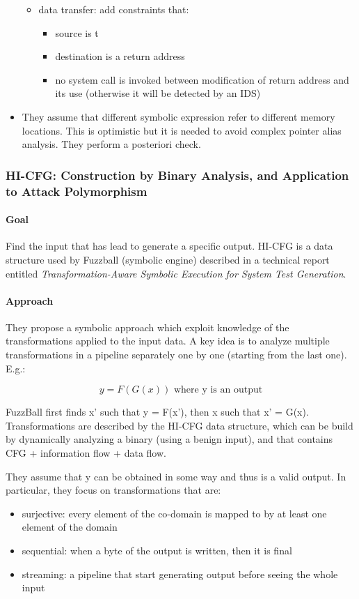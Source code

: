 \begin{itemize}
\begin{itemize}
    \item data transfer: add constraints that:
      \begin{itemize}
        \item source is t
        \item destination is a return address 
        \item no system call is invoked between modification of return address and its use (otherwise it will be detected by an IDS)
      \end{itemize}
  \end{itemize}
  \item They assume that different symbolic expression refer to different memory locations. This is optimistic but it is needed to avoid complex pointer alias analysis. They perform a posteriori check.

\end{itemize}

\subsubsection{\cite{FUZZBALL-ESORICS13} HI-CFG: Construction by Binary Analysis, and Application to Attack Polymorphism} 

\paragraph{Goal}
Find the input that has lead to generate a specific output. HI-CFG is a data structure used by Fuzzball (symbolic engine) described in a technical report entitled {\em Transformation-Aware Symbolic Execution for System Test Generation}.

\paragraph{Approach}
They propose a symbolic approach which exploit knowledge of the transformations applied to the input data. A key idea is to analyze multiple transformations in a pipeline separately one by one (starting from the last one). E.g.:

\[y = F(G(x)) \text{ where y is an output} \]

FuzzBall first finds x' such that y = F(x'), then x such that x' = G(x). Transformations are described by the HI-CFG data structure, which can be build by dynamically analyzing a binary (using a benign input), and that contains CFG + information flow + data flow.

They assume that y can be obtained in some way and thus is a valid output. In particular, they focus on transformations that are:
\begin{itemize}
  \item surjective: every element of the co-domain is mapped to by at least one element of the domain
  \item sequential: when a byte of the output is written, then it is final
  \item streaming: a pipeline that start generating output before seeing the whole input
\end{itemize}

